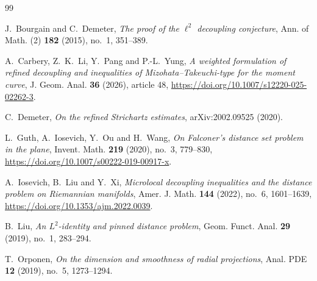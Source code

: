 \documentclass[11pt,letterpaper]{amsart}
\begin{document}
\begin{thebibliography}{99}

J.~Bourgain and C.~Demeter,
\emph{The proof of the $\ell^2$ decoupling conjecture},
Ann. of Math. (2) \textbf{182} (2015), no.~1, 351--389.

A.~Carbery, Z.~K.~Li, Y.~Pang and P.-L.~Yung,
\emph{A weighted formulation of refined decoupling and inequalities of
Mizohata--Takeuchi-type for the moment curve},
J. Geom. Anal. \textbf{36} (2026), article 48,
\url{https://doi.org/10.1007/s12220-025-02262-3}.

C.~Demeter,
\emph{On the refined Strichartz estimates},
arXiv:2002.09525 (2020).

L.~Guth, A.~Iosevich, Y.~Ou and H.~Wang,
\emph{On Falconer's distance set problem in the plane},
Invent. Math. \textbf{219} (2020), no.~3, 779--830,
\url{https://doi.org/10.1007/s00222-019-00917-x}.

A.~Iosevich, B.~Liu and Y.~Xi,
\emph{Microlocal decoupling inequalities and the distance problem on
Riemannian manifolds},
Amer. J. Math. \textbf{144} (2022), no.~6, 1601--1639,
\url{https://doi.org/10.1353/ajm.2022.0039}.

B.~Liu,
\emph{An $L^2$-identity and pinned distance problem},
Geom. Funct. Anal. \textbf{29} (2019), no.~1, 283--294.

T.~Orponen,
\emph{On the dimension and smoothness of radial projections},
Anal. PDE \textbf{12} (2019), no.~5, 1273--1294.

\end{thebibliography}
\end{document}
